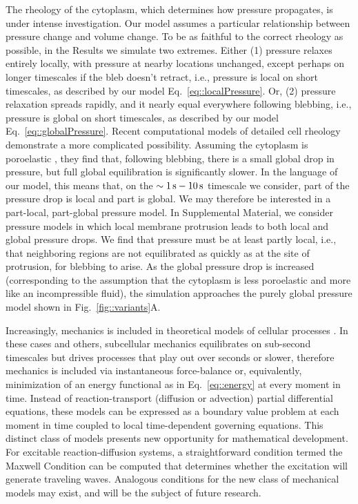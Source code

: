 {\color{blue}
The rheology of the cytoplasm, which determines how pressure propagates, is under intense investigation. Our model assumes  a particular relationship between pressure change and volume change. To be as faithful to the correct rheology as possible, in the Results we simulate two extremes. Either (1) pressure relaxes entirely locally, with pressure at nearby locations unchanged, except perhaps on longer timescales if the bleb doesn't retract, i.e., pressure is local on short timescales, as described by our model Eq.~\ref{eq::localPressure}. Or, (2) pressure relaxation spreads rapidly, and it nearly equal everywhere following blebbing, i.e., pressure is global on short timescales, as described by our model Eq.~\ref{eq::globalPressure}. Recent computational models of detailed cell rheology \cite{Strychalski:HizQv1Ti} demonstrate a more complicated possibility. Assuming the cytoplasm is poroelastic \cite{Charras:2009dp, Moeendarbary:2013bs}, they find that, following blebbing, there is a small global drop in pressure, but full global equilibration is significantly slower. In the language of our model, this means that, on the $\sim1\,\mbox{s}-10\,\mbox{s}$ timescale we consider, part of the pressure drop is local and part is global. We may therefore be interested in a part-local, part-global pressure model. In Supplemental Material, we consider pressure models in which local membrane protrusion leads to both local and global pressure drops. We find that pressure must be at least partly local, i.e., that neighboring regions are not equilibrated as quickly as at the site of protrusion, for blebbing to arise. As the global pressure drop is increased (corresponding to the assumption that the cytoplasm is less poroelastic and more like an incompressible fluid), the simulation approaches the purely global pressure model shown in Fig.~\ref{fig::variants}A.   
}

Increasingly, mechanics is included in theoretical models of cellular processes \cite{Paszek:2015it,Thon:2012dh,Peleg:2011fz,Dobrowsky:2010dr,Qi:2006ez}. In these cases and others, subcellular mechanics equilibrates on sub-second timescales but drives processes that play out over seconds or slower, therefore mechanics is included via instantaneous force-balance or, equivalently, minimization of an energy functional as in Eq.~\ref{eq::energy} at every moment in time. Instead of reaction-transport (diffusion or advection) partial differential equations, these models can be expressed as a boundary value problem at each moment in time coupled to local time-dependent governing equations. This distinct class of models presents new opportunity for mathematical development. 
For excitable reaction-diffusion systems, a straightforward condition termed the Maxwell Condition \cite{Mori:2008hj,Anonymous:OS1MPwCl,Murray:ur} can be computed that determines whether the excitation will generate traveling waves. Analogous conditions for the new class of mechanical models may exist, and will be the subject of future research. 

